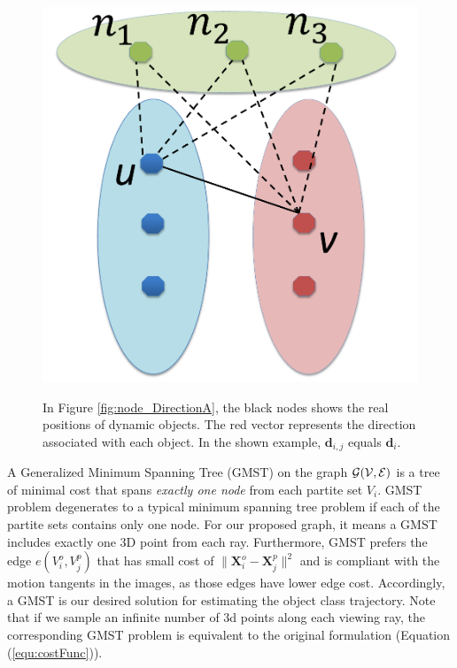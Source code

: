 \begin{figure}[t]
{    \includegraphics[height=0.19\textheight]{chapter4/resource/edgeReduction_cropped.pdf}
    \label{fig:node_edgeRemove}
}

\caption{In Figure \ref{fig:node_DirectionA}, the black nodes shows the real positions of dynamic objects. The red vector represents the direction associated with each object. In the shown example, $\mathbf{d}_{i,j}$ equals $\mathbf{d}_{i}$.  }
\label{fig:nodeDirection}
\end{figure}

A Generalized Minimum Spanning Tree (GMST) on the graph $\cal{G}(V,E)$ is a tree of minimal cost that spans \emph{exactly one node} from each partite set $V_i$. GMST problem degenerates to a typical minimum spanning tree problem \cite{Cormen:2001:IA:580470} if each of the partite sets contains only one node.
For our proposed graph, it means a GMST includes exactly one 3D point from each ray. Furthermore, GMST prefers the edge $e(V_i^o,V_j^p)$ that has small cost of $\|\mathbf{X}_i^o-\mathbf{X}_j^p\|^2$ and is compliant with the motion tangents in the images, as those edges have lower edge cost. Accordingly, a GMST is our desired solution for estimating the object class trajectory. Note that if we sample an infinite number of 3d points along each viewing ray, the corresponding GMST problem is equivalent to the original formulation (Equation (\ref{equ:costFunc})).%

